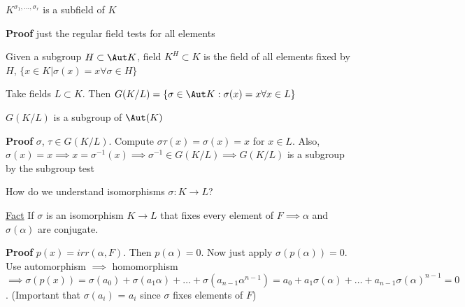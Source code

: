 \documentclass[10pt]{article}
\begin{document}
\begin{lem}
    $K^{\sigma_1, \ldots, \sigma_r}$ is a subfield of $K$
\end{lem}
\textbf{Proof} just the regular field tests for all elements

Given a subgroup $H \subset \Aut K$, field $K^H \subset K$ is the field of all elements fixed by $H$, $\{ x\in K | \sigma(x) = x \forall \sigma \in H\}$

\begin{defn}
    Take fields $L \subset K$. Then $G(K/L) = \{\sigma \in \Aut K : \sigma(x) = x \forall x \in L\}$ 
\end{defn}

\begin{lem}
    $G(K/L)$ is a subgroup of $\Aut(K)$
\end{lem}
\textbf{Proof} $\sigma$, $\tau \in G(K/L)$. Compute $\sigma\tau(x) = \sigma(x) = x$ for $x \in L$. Also, $\sigma(x) = x \implies x = \sigma^{-1}(x) \implies \sigma^{-1} \in G(K/L) \implies G(K/L)$ is a subgroup by the subgroup test

How do we understand isomorphisms $\sigma: K \to L$?

\underline{Fact} If $\sigma$ is an isomorphism $K \to L$ that fixes every element of $F \implies \alpha$ and $\sigma(\alpha)$ are conjugate.

\textbf{Proof} $p(x) = irr(\alpha, F)$. Then $p(\alpha) = 0$. Now just apply $\sigma(p(\alpha)) = 0$. Use automorphism $\implies$ homomorphism $\implies \sigma(p(x)) = \sigma(a_0) + \sigma(a_1\alpha) + \ldots + \sigma(a_{n-1}\alpha^{n-1}) = a_0 + a_1\sigma(\alpha) + \ldots + a_{n-1}\sigma(\alpha)^{n-1} = 0$. (Important that $\sigma(a_i)$ = $a_i$ since $\sigma$ fixes elements of $F$)
\end{document}
